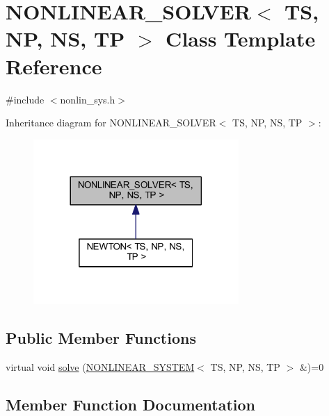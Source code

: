 \hypertarget{class_n_o_n_l_i_n_e_a_r___s_o_l_v_e_r}{}\section{N\+O\+N\+L\+I\+N\+E\+A\+R\+\_\+\+S\+O\+L\+V\+ER$<$ TS, NP, NS, TP $>$ Class Template Reference}
\label{class_n_o_n_l_i_n_e_a_r___s_o_l_v_e_r}


{\ttfamily \#include $<$nonlin\+\_\+sys.\+h$>$}



Inheritance diagram for N\+O\+N\+L\+I\+N\+E\+A\+R\+\_\+\+S\+O\+L\+V\+ER$<$ TS, NP, NS, TP $>$\+:
\nopagebreak
\begin{figure}[H]
\begin{center}
\leavevmode
\includegraphics[width=221pt]{class_n_o_n_l_i_n_e_a_r___s_o_l_v_e_r__inherit__graph}
\end{center}
\end{figure}
\subsection*{Public Member Functions}
\begin{DoxyCompactItemize}
\item 
virtual void \mbox{\hyperlink{class_n_o_n_l_i_n_e_a_r___s_o_l_v_e_r_aae333fb75e2d5d8baa0e37991bfac7c4}{solve}} (\mbox{\hyperlink{class_n_o_n_l_i_n_e_a_r___s_y_s_t_e_m}{N\+O\+N\+L\+I\+N\+E\+A\+R\+\_\+\+S\+Y\+S\+T\+EM}}$<$ TS, NP, NS, TP $>$ \&)=0
\end{DoxyCompactItemize}


\subsection{Member Function Documentation}
\mbox{\label{class_n_o_n_l_i_n_e_a_r___s_o_l_v_e_r_aae333fb75e2d5d8baa0e37991bfac7c4}} 
